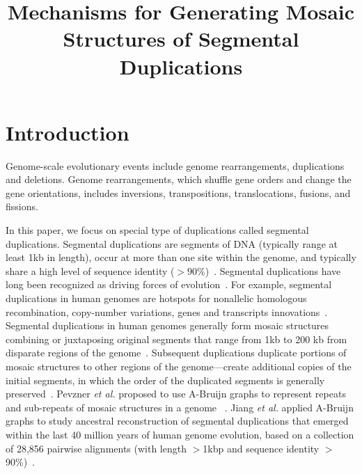 \documentclass[12pt]{article}
\begin{document}
%

%
\title{Mechanisms for Generating Mosaic Structures of Segmental Duplications}
%

%
\maketitle              

\section{Introduction}

Genome-scale evolutionary events include genome rearrangements, duplications and deletions. 
Genome rearrangements, which shuffle gene orders and change the gene orientations, 
includes inversions, transpositions, translocations, fusions, and fissions. 

In this paper, we focus on special type of duplications called segmental duplications. 
Segmental duplications are segments of DNA (typically range at least 1kb in length), 
occur at more than one site within the genome, and typically share a high level of sequence identity ($>90\%$)~\cite{eichler2001}. 
Segmental duplications have long been recognized as driving forces of evolution~\cite{bailey2006primate}. 
For example, segmental duplications in human genomes are hotspots 
for nonallelic homologous recombination, copy-number variations, genes and transcripts innovations~\cite{jiang2007ancestral}. 
Segmental duplications in human genomes generally form mosaic structures combining or juxtaposing original segments 
that range from 1kb to 200 kb from disparate regions of the genome~\cite{samonte2002segmental}. 
Subsequent duplications duplicate portions of mosaic structures to other regions of the genome---create additional copies of the initial segments, 
in which the order of the duplicated segments is generally preserved~\cite{bailey2002human}. 
Pevzner \emph{et al.} proposed to use A-Bruijn graphs to represent repeats and sub-repeats of mosaic structures in a genome ~\cite{pevzner2004}. 
Jiang \emph{et al.} applied A-Bruijn graphs to study ancestral reconstruction of segmental duplications that emerged within the last 40 million years of human genome evolution,  
based on a collection of 28,856 pairwise alignments (with length $>$1kbp and sequence identity $>$90\%)~\cite{jiang2007ancestral}.
\end{document}
